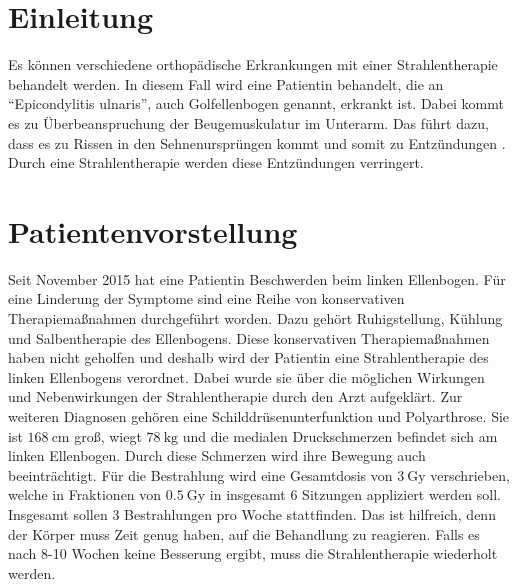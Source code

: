 \section{Einleitung}
\label{sec:Einleitung}
Es können verschiedene orthopädische Erkrankungen mit einer Strahlentherapie behandelt werden.
In diesem Fall wird eine Patientin behandelt, die an \enquote{Epicondylitis ulnaris}, auch Golfellenbogen genannt, erkrankt ist.
Dabei kommt es zu Überbeanspruchung der Beugemuskulatur im Unterarm. Das führt dazu, dass es zu Rissen in den Sehnenursprüngen kommt und
somit zu Entzündungen \cite{Elle}. Durch eine Strahlentherapie werden diese Entzündungen verringert.

\section{Patientenvorstellung}
\label{sec:Vorstellung}
Seit November 2015 hat eine Patientin Beschwerden beim linken Ellenbogen. Für eine Linderung der Symptome sind eine Reihe von konservativen
Therapiemaßnahmen durchgeführt worden. Dazu gehört Ruhigstellung, Kühlung und Salbentherapie des Ellenbogens.
Diese konservativen Therapiemaßnahmen haben nicht geholfen und deshalb wird der Patientin eine Strahlentherapie des linken Ellenbogens
verordnet. Dabei wurde sie über die möglichen Wirkungen und Nebenwirkungen der Strahlentherapie durch den Arzt aufgeklärt.
Zur weiteren Diagnosen gehören eine Schilddrüsenunterfunktion und Polyarthrose.
Sie ist $\SI{168}{\centi\meter}$ groß, wiegt $\SI{78}{\kilo\gram}$ und die medialen Druckschmerzen befindet sich am linken Ellenbogen.
Durch diese Schmerzen wird ihre Bewegung auch beeinträchtigt. Für die Bestrahlung wird eine Gesamtdosis von $\SI{3}{\gray}$ verschrieben,
welche in Fraktionen von $\SI{0,5}{\gray}$ in insgesamt 6 Sitzungen appliziert werden soll. Insgesamt sollen 3 Bestrahlungen pro Woche stattfinden.
Das ist hilfreich, denn der Körper muss Zeit genug haben, auf die Behandlung zu reagieren. Falls es nach 8-10 Wochen keine Besserung ergibt,
muss die Strahlentherapie wiederholt werden.

